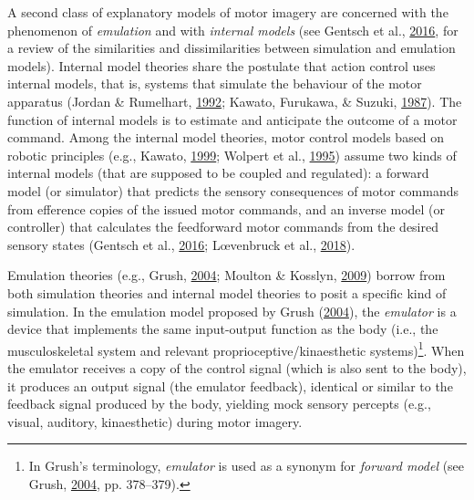 \documentclass[a4paper,12pt,twoside,openright,oldfontcommands]{memoir}
\let\rmarkdownfootnote\footnote%
\def\footnote{\protect\rmarkdownfootnote}
\begin{document}
A second class of explanatory models of motor imagery are concerned with the phenomenon of \emph{emulation} and with \emph{internal models} (see Gentsch et al., \protect\hyperlink{ref-gentsch_towards_2016}{2016}, for a review of the similarities and dissimilarities between simulation and emulation models). Internal model theories share the postulate that action control uses internal models, that is, systems that simulate the behaviour of the motor apparatus (Jordan \& Rumelhart, \protect\hyperlink{ref-jordan_forward_1992}{1992}; Kawato, Furukawa, \& Suzuki, \protect\hyperlink{ref-kawato_hierarchical_1987}{1987}). The function of internal models is to estimate and anticipate the outcome of a motor command. Among the internal model theories, motor control models based on robotic principles (e.g., Kawato, \protect\hyperlink{ref-kawato_internal_1999}{1999}; Wolpert et al., \protect\hyperlink{ref-wolpert_internal_1995}{1995}) assume two kinds of internal models (that are supposed to be coupled and regulated): a forward model (or simulator) that predicts the sensory consequences of motor commands from efference copies of the issued motor commands, and an inverse model (or controller) that calculates the feedforward motor commands from the desired sensory states (Gentsch et al., \protect\hyperlink{ref-gentsch_towards_2016}{2016}; Lœvenbruck et al., \protect\hyperlink{ref-loevenbruck_cognitive_2018}{2018}).

Emulation theories (e.g., Grush, \protect\hyperlink{ref-grush_emulation_2004}{2004}; Moulton \& Kosslyn, \protect\hyperlink{ref-moulton_imagining_2009}{2009}) borrow from both simulation theories and internal model theories to posit a specific kind of simulation. In the emulation model proposed by Grush (\protect\hyperlink{ref-grush_emulation_2004}{2004}), the \emph{emulator} is a device that implements the same input-output function as the body (i.e., the musculoskeletal system and relevant proprioceptive/kinaesthetic systems)\footnote{In Grush's terminology, \emph{emulator} is used as a synonym for \emph{forward model} (see Grush, \protect\hyperlink{ref-grush_emulation_2004}{2004}, pp. 378--379).}. When the emulator receives a copy of the control signal (which is also sent to the body), it produces an output signal (the emulator feedback), identical or similar to the feedback signal produced by the body, yielding mock sensory percepts (e.g., visual, auditory, kinaesthetic) during motor imagery.
\end{document}
